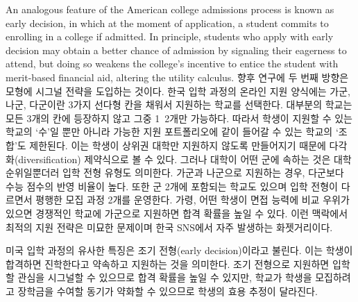 \documentclass[11pt]{article} %
\theoremstyle{definition}
\theoremstyle{definition}
\begin{document}
An analogous feature of the American college admissions process is known as early decision, in which at the moment of application, a student commits to enrolling in a college if admitted. In principle, students who apply with early decision may obtain a better chance of admission by signaling their eagerness to attend, but doing so weakens the college's incentive to entice the student with merit-based financial aid, altering the utility calculus.
\else
향후 연구에 두 번째 방향은 모형에 시그널 전략을 도입하는 것이다. 한국 입학 과정의 온라인 지원 양식에는 가군, 나군, 다군이란 3가지 선다형 칸을 채워서 지원하는 학교를 선택한다. 대부분의 학교는 모든 3개의 칸에 등장하지 않고 그중 1~2개만 가능하다. 따라서 학생이 지원할 수 있는 학교의 `수'일 뿐만 아니라 가능한 지원 포트폴리오에 같이 들어갈 수 있는 학교의 `조합'도 제한된다. 이는 학생이 상위권 대학만 지원하지 않도록 만들어지기 때문에 다각화(diversification) 제약식으로 볼 수 있다. 그러나 대학이 어떤 군에 속하는 것은 대학 순위일뿐더러 입학 전형 유형도 의미한다. 가군과 나군으로 지원하는 경우, 다군보다 수능 점수의 반영 비율이 높다. 또한 군 2개에 포함되는 학교도 있으며 입학 전형이 다르면서 평행한 모집 과정 2개를 운영한다. 가령, 어떤 학생이 면접 능력에 비교 우위가 있으면 경쟁적인 학교에 가군으로 지원하면 합격 확률을 높일 수 있다. 이런 맥락에서 최적의 지원 전략은 미묘한 문제이며 한국 SNS에서 자주 발생하는 화젯거리이다.

미국 입학 과정의 유사한 특징은 조기 전형(early decision)이라고 불린다. 이는 학생이 합격하면 진학한다고 약속하고 지원하는 것을 의미한다. 조기 전형으로 지원하면 입학할 관심을 시그널할 수 있으므로 합격 확률을 높일 수 있지만, 학교가 학생을 모집하려고 장학금을 수여할 동기가 약화할 수 있으므로 학생의 효용 추정이 달라진다.
\fi
\end{document}
